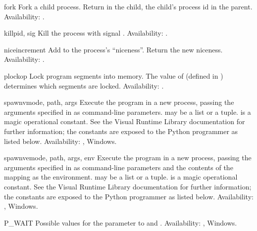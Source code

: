 \begin{funcdesc}{fork}{}
Fork a child process.  Return  in the child, the child's
process id in the parent.
Availability: \UNIX{}.
\end{funcdesc}

\begin{funcdesc}{kill}{pid, sig}
Kill the process  with signal .
Availability: \UNIX{}.
\end{funcdesc}

\begin{funcdesc}{nice}{increment}
Add  to the process's ``niceness''.  Return the new
niceness.
Availability: \UNIX{}.
\end{funcdesc}

\begin{funcdesc}{plock}{op}
Lock program segments into memory.  The value of 
(defined in ) determines which segments are locked.
Availability: \UNIX{}.
\end{funcdesc}

\begin{funcdesc}{spawnv}{mode, path, args}
Execute the program  in a new process, passing the arguments 
specified in  as command-line parameters.   may be 
a list or a tuple.   is a magic operational constant.  See
the Visual \Cpp{} Runtime Library documentation for further
information; the constants are exposed to the Python programmer as
listed below.
Availability: \UNIX{}, Windows.
\end{funcdesc}

\begin{funcdesc}{spawnve}{mode, path, args, env}
Execute the program  in a new process, passing the arguments 
specified in  as command-line parameters and the contents of 
the mapping  as the environment.   may be a list or
a tuple.   is a magic operational constant.  See the Visual
\Cpp{} Runtime Library documentation for further information; the
constants are exposed to the Python programmer as listed below.
Availability: \UNIX{}, Windows.
\end{funcdesc}

\begin{datadesc}{P_WAIT}
Possible values for the  parameter to 
and .
Availability: \UNIX{}, Windows.
\end{datadesc}

